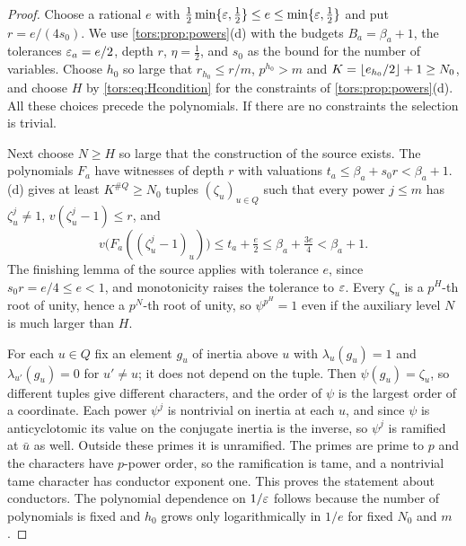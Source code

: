 \begin{proof}
Choose a rational $e$ with $\tfrac12\min\{\varepsilon,\tfrac12\}\le e\le\min\{\varepsilon,\tfrac12\}$
and put $r=e/(4s_0)$. We use \cref{tors:prop:powers}(d) with the budgets
$B_a=\beta_a+1$, the tolerances $\varepsilon_a=e/2$, depth $r$, $\eta=\tfrac12$, and $s_0$ as the
bound for the number of variables. Choose $h_0$ so large that $r_{h_0}\le r/m$,
$p^{h_0}>m$ and $K=\lfloor e_{h_0}/2\rfloor+1\ge N_0$, and choose $H$ by
\eqref{tors:eq:Hcondition} for the constraints of \cref{tors:prop:powers}(d). All these
choices precede the polynomials. If there are no constraints the selection is trivial.

Next choose $N\ge H$ so large that the construction of the source exists. The
polynomials $F_a$ have witnesses of depth $r$ with valuations
$t_a\le\beta_a+s_0r<\beta_a+1$. (d) gives at least
$K^{\#Q}\ge N_0$ tuples $(\zeta_u)_{u\in Q}$ such that every power $j\le m$ has
$\zeta_u^j\ne1$, $v(\zeta_u^j-1)\le r$, and
\[
  v\bigl(F_a((\zeta_u^j-1)_u)\bigr)\le t_a+\tfrac e2\le\beta_a+\tfrac{3e}4<\beta_a+1 .
\]
The finishing lemma of the source applies with tolerance $e$, since $s_0r=e/4\le e<1$,
and monotonicity raises the tolerance to $\varepsilon$. Every $\zeta_u$ is a $p^H$-th root of
unity, hence a $p^N$-th root of unity, so $\psi^{p^H}=1$ even if the auxiliary level $N$
is much larger than $H$.

For each $u\in Q$ fix an element $g_u$ of inertia above $u$ with $\lambda_u(g_u)=1$ and
$\lambda_{u'}(g_u)=0$ for $u'\ne u$; it does not depend on the tuple. Then
$\psi(g_u)=\zeta_u$, so different tuples give different characters, and the order of
$\psi$ is the largest order of a coordinate. Each power $\psi^j$ is nontrivial on
inertia at each $u$, and since $\psi$ is anticyclotomic its value on the conjugate
inertia is the inverse, so $\psi^j$ is ramified at $\bar u$ as well. Outside these primes
it is unramified. The primes are prime to $p$ and the characters have $p$-power order,
so the ramification is tame, and a nontrivial tame character has conductor exponent one.
This proves the statement about conductors. The polynomial dependence on $1/\varepsilon$ follows
because the number of polynomials is fixed and $h_0$ grows only logarithmically in $1/e$
for fixed $N_0$ and $m$.
\end{proof}

